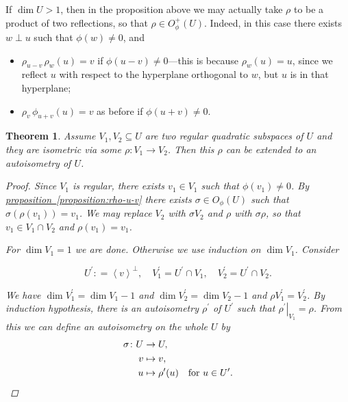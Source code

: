 \documentclass{article}
\newcommand{\dfn}{\mathrel{\mathop:}=}
\newcommand{\refref}[2]{\hyperref[#2]{#1~\ref*{#2}}}
\theoremstyle{myplain}
\newtheorem{theorem}[proposition]{Theorem}
\theoremstyle{mydefinition}
\begin{document}
If $\dim U > 1$, then in the proposition above we may actually take $\rho$ to be
a product of two reflections, so that $\rho \in O_\phi^+ (U)$. Indeed, in this
case there exists $w \perp u$ such that $\phi (w) \ne 0$, and
\begin{itemize}
\item $\rho_{u-v} \, \rho_w (u) = v$ if $\phi (u-v) \ne 0$---this is because
  $\rho_w (u) = u$, since we reflect $u$ with respect to the hyperplane
  orthogonal to $w$, but $u$ is in that hyperplane;

\item $\rho_v \, \phi_{u+v} (u) = v$ as before if $\phi (u+v) \ne 0$.
\end{itemize}

\begin{theorem}
  Assume $V_1, V_2 \subseteq U$ are two regular quadratic subspaces of $U$ and
  they are isometric via some $\rho\colon V_1 \to V_2$. Then this $\rho$ can be
  extended to an autoisometry of $U$.

  \begin{proof}
    Since $V_1$ is regular, there exists $v_1 \in V_1$ such that
    $\phi (v_1) \ne 0$. By \refref{proposition}{proposition:rho-u-v} there
    exists $\sigma \in O_\phi (U)$ such that $\sigma (\rho(v_1)) = v_1$. We may
    replace $V_2$ with $\sigma V_2$ and $\rho$ with $\sigma \rho$, so that
    $v_1 \in V_1 \cap V_2$ and $\rho (v_1) = v_1$.

    For $\dim V_1 = 1$ we are done. Otherwise we use induction on $\dim
    V_1$. Consider

    \[ U^\prime \dfn \left<v\right>^\perp, \quad
      V_1^\prime = U^\prime \cap V_1, \quad
      V_2^\prime = U^\prime \cap V_2. \]

    We have $\dim V_1^\prime = \dim V_1 - 1$ and
    $\dim V_2^\prime = \dim V_2 - 1$ and $\rho V_1^\prime = V_2^\prime$. By
    induction hypothesis, there is an autoisometry $\rho^\prime$ of $U^\prime$
    such that $\left.\rho^\prime\right|_{V_1} = \rho$. From this we can define
    an autoisometry on the whole $U$ by
    \begin{align*}
      \sigma\colon U & \to U,\\
      v & \mapsto v,\\
      u & \mapsto \rho^\prime (u) \quad \text{for } u\in U^\prime. \qedhere
    \end{align*}
  \end{proof}
\end{theorem}
\end{document}
